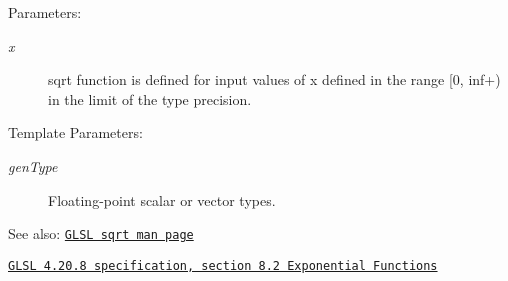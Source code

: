 \begin{Desc}
\item[Parameters:]
\begin{description}
\item[{\em x}]sqrt function is defined for input values of x defined in the range \mbox{[}0, inf+) in the limit of the type precision. \end{description}
\end{Desc}
\begin{Desc}
\item[Template Parameters:]
\begin{description}
\item[{\em genType}]Floating-point scalar or vector types.\end{description}
\end{Desc}
\begin{Desc}
\item[See also:]\href{http://www.opengl.org/sdk/docs/manglsl/xhtml/sqrt.xml}{\tt GLSL sqrt man page} 

\href{http://www.opengl.org/registry/doc/GLSLangSpec.4.20.8.pdf}{\tt GLSL 4.20.8 specification, section 8.2 Exponential Functions} \end{Desc}

